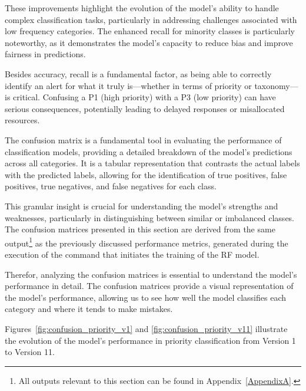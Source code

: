 These improvements highlight the evolution of the model's ability to handle complex classification tasks, particularly in addressing challenges associated with low frequency categories. 
The enhanced recall for minority classes is particularly noteworthy, as it demonstrates the model's capacity to reduce bias and improve fairness in predictions.

Besides accuracy, recall is a fundamental factor, as being able to correctly identify an alert for what it truly is—whether in terms of priority or taxonomy—is critical. 
Confusing a P1 (high priority) with a P3 (low priority) can have serious consequences, potentially leading to delayed responses or misallocated resources.

The confusion matrix is a fundamental tool in evaluating the performance of classification models, providing a detailed breakdown of the model's predictions across all categories. 
It is a tabular representation that contrasts the actual labels with the predicted labels, allowing for the identification of true positives, false positives, true negatives, and false negatives for each class. 

This granular insight is crucial for understanding the model's strengths and weaknesses, particularly in distinguishing between similar or imbalanced classes. 
The confusion matrices presented in this section are derived from the same output\footnote{All outputs relevant to this section can be found in Appendix~\ref{AppendixA}.} as the previously discussed performance metrics, generated during the execution of the command that initiates the training of the RF model.

Therefor, analyzing the confusion matrices is essential to understand the model's performance in detail.
The confusion matrices provide a visual representation of the model's performance, allowing us to see how well the model classifies each category and where it tends to make mistakes.

Figures~\ref{fig:confusion_priority_v1} and \ref{fig:confusion_priority_v11} illustrate the evolution of the model's performance in priority classification from Version 1 to Version 11. 

